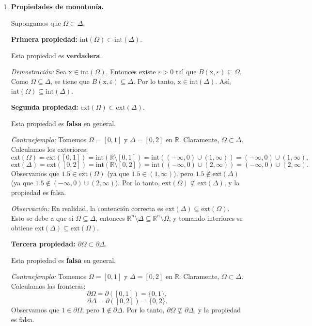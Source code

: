 \documentclass[12pt]{article}
\newcommand{\Ext}{\mathrm{ext}}
\newcommand{\Int}{\mathrm{int}}
\newcommand{\R}{\mathbb R}
\newcommand{\x}{\mathrm x}
\begin{document}
\begin{enumerate}
\begin{enumerate}[(1)]
\item \textbf{Propiedades de monotonía.}

Supongamos que $\Omega \subset \Delta$.

\textbf{Primera propiedad:} $\Int(\Omega)\subset \Int(\Delta)$.

Esta propiedad es \textbf{verdadera}.

\textit{Demostración:} Sea $\x \in \Int(\Omega)$. Entonces existe $\varepsilon > 0$ tal que $B(\x, \varepsilon) \subseteq \Omega$. Como $\Omega \subseteq \Delta$, se tiene que $B(\x, \varepsilon) \subseteq \Delta$. Por lo tanto, $\x \in \Int(\Delta)$. Así, $\Int(\Omega) \subseteq \Int(\Delta)$.

\textbf{Segunda propiedad:} $\Ext(\Omega)\subset \Ext(\Delta)$.

Esta propiedad es \textbf{falsa} en general.

\textit{Contraejemplo:} Tomemos $\Omega = [0,1]$ y $\Delta = [0,2]$ en $\R$. Claramente, $\Omega \subset \Delta$. Calculamos los exteriores:
\[
\Ext(\Omega) = \Ext([0,1]) = \Int(\R \setminus [0,1]) = \Int((-\infty, 0) \cup (1, \infty)) = (-\infty, 0) \cup (1, \infty),
\]
\[
\Ext(\Delta) = \Ext([0,2]) = \Int(\R \setminus [0,2]) = \Int((-\infty, 0) \cup (2, \infty)) = (-\infty, 0) \cup (2, \infty).
\]
Observamos que $1.5 \in \Ext(\Omega)$ (ya que $1.5 \in (1, \infty)$), pero $1.5 \notin \Ext(\Delta)$ (ya que $1.5 \notin (-\infty, 0) \cup (2, \infty)$). Por lo tanto, $\Ext(\Omega) \not\subseteq \Ext(\Delta)$, y la propiedad es falsa.

\textit{Observación:} En realidad, la contención correcta es $\Ext(\Delta) \subseteq \Ext(\Omega)$. Esto se debe a que si $\Omega \subseteq \Delta$, entonces $\R^n \setminus \Delta \subseteq \R^n \setminus \Omega$, y tomando interiores se obtiene $\Ext(\Delta) \subseteq \Ext(\Omega)$.

\textbf{Tercera propiedad:} $\partial \Omega\subset \partial \Delta$.

Esta propiedad es \textbf{falsa} en general.

\textit{Contraejemplo:} Tomemos $\Omega = [0,1]$ y $\Delta = [0,2]$ en $\R$. Claramente, $\Omega \subset \Delta$. Calculamos las fronteras:
\[
\partial \Omega = \partial([0,1]) = \{0, 1\},
\]
\[
\partial \Delta = \partial([0,2]) = \{0, 2\}.
\]
Observamos que $1 \in \partial \Omega$, pero $1 \notin \partial \Delta$. Por lo tanto, $\partial \Omega \not\subseteq \partial \Delta$, y la propiedad es falsa.
\end{enumerate}


\end{enumerate}
\end{document}
